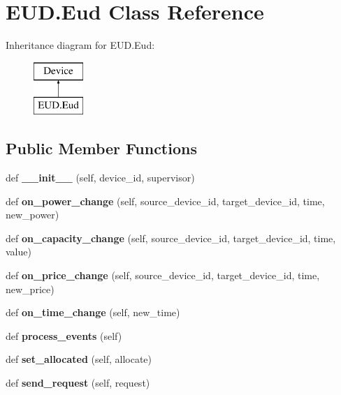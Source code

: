 \hypertarget{class_e_u_d_1_1_eud}{}\section{E\+U\+D.\+Eud Class Reference}
\label{class_e_u_d_1_1_eud}
Inheritance diagram for E\+U\+D.\+Eud\+:\begin{figure}[H]
\begin{center}
\leavevmode
\includegraphics[height=2.000000cm]{class_e_u_d_1_1_eud}
\end{center}
\end{figure}
\subsection*{Public Member Functions}
\begin{DoxyCompactItemize}
\item 
\mbox{\label{class_e_u_d_1_1_eud_ae051ec0c4270509aa988b5ae9a989055}} 
def {\bfseries \+\_\+\+\_\+init\+\_\+\+\_\+} (self, device\+\_\+id, supervisor)
\item 
\mbox{\label{class_e_u_d_1_1_eud_a2cb2f8d68e0dcff8da5078ca0d954af4}} 
def {\bfseries on\+\_\+power\+\_\+change} (self, source\+\_\+device\+\_\+id, target\+\_\+device\+\_\+id, time, new\+\_\+power)
\item 
\mbox{\label{class_e_u_d_1_1_eud_a62e7b3e5e8395a2d70be4d8967735aa4}} 
def {\bfseries on\+\_\+capacity\+\_\+change} (self, source\+\_\+device\+\_\+id, target\+\_\+device\+\_\+id, time, value)
\item 
\mbox{\label{class_e_u_d_1_1_eud_aaa9ef93d0c1635f310bec04a9c214b61}} 
def {\bfseries on\+\_\+price\+\_\+change} (self, source\+\_\+device\+\_\+id, target\+\_\+device\+\_\+id, time, new\+\_\+price)
\item 
\mbox{\label{class_e_u_d_1_1_eud_af75ff7597f0adc361b62d790f531c213}} 
def {\bfseries on\+\_\+time\+\_\+change} (self, new\+\_\+time)
\item 
\mbox{\label{class_e_u_d_1_1_eud_a206a8e7705cb533ab86a524897572f68}} 
def {\bfseries process\+\_\+events} (self)
\item 
\mbox{\label{class_e_u_d_1_1_eud_a669adf7a73efad185dbee1daa6f0e5d2}} 
def {\bfseries set\+\_\+allocated} (self, allocate)
\item 
\mbox{\label{class_e_u_d_1_1_eud_a8580909e552286ccb855132722a84f29}} 
def {\bfseries send\+\_\+request} (self, request)
\end{DoxyCompactItemize}
